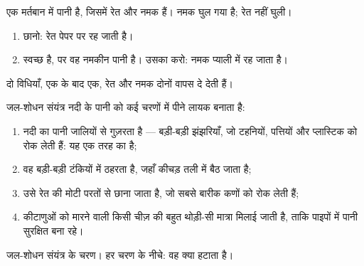\begin{example}[रेत, नमक और पानी]\label{ex:g3:separating-mixtures:three}
एक मर्तबान में पानी है, जिसमें रेत और नमक हैं। नमक घुल गया है; रेत
नहीं घुली।
\begin{enumerate}
  \item छानो: रेत पेपर पर रह जाती है।
  \item {} स्वच्छ है, पर वह नमकीन पानी है। उसका  करो:
        नमक प्याली में रह जाता है।
\end{enumerate}
दो विधियाँ, एक के बाद एक, रेत और नमक दोनों वापस दे देती हैं।
\end{example}

\begin{example}[नदी से साफ़ पानी]\label{ex:g3:separating-mixtures:plant}
जल-शोधन संयंत्र नदी के पानी को कई चरणों में पीने लायक बनाता है:
\begin{enumerate}
  \item नदी का पानी जालियों से गुज़रता है --- बड़ी-बड़ी झंझरियाँ, जो
        टहनियों, पत्तियों और प्लास्टिक को रोक लेती हैं: यह एक तरह का  है;
  \item वह बड़ी-बड़ी टंकियों में ठहरता है, जहाँ कीचड़ तली में बैठ जाता है;
  \item उसे रेत की मोटी परतों से छाना जाता है, जो सबसे बारीक कणों को
        रोक लेती हैं;
  \item कीटाणुओं को मारने वाली किसी चीज़ की बहुत थोड़ी-सी मात्रा मिलाई
        जाती है, ताकि पाइपों में पानी सुरक्षित बना रहे।
\end{enumerate}
\end{example}

\begin{omfigure}

{\small जल-शोधन संयंत्र के चरण। हर चरण के नीचे: वह क्या
हटाता है।}
\end{omfigure}

